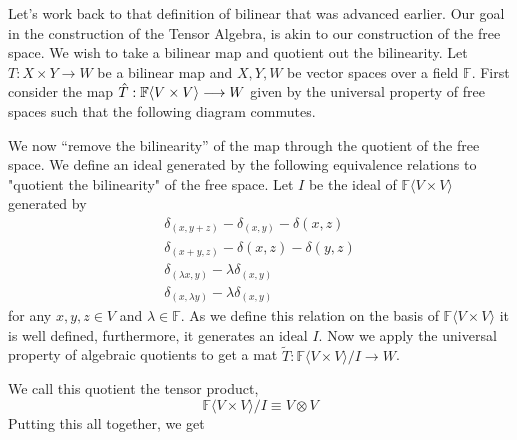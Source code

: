 \documentclass[12pt]{extarticle}
\newcommand{\freespace}[1] {{\F\langle #1 \rangle}}
\renewcommand{\to}[0]{\longrightarrow}
\newcommand{\F}{{\mathbb{F}}}
\begin{document}
Let's work back to that definition of bilinear that was advanced earlier. Our goal in the construction of the Tensor Algebra, is akin to our construction of the free space. We wish to take a bilinear map and quotient out the bilinearity. Let $T : X \times Y \to W$ be a bilinear map and $X, Y, W$ be vector spaces over a field $\F$. First consider the map $\Hat{T} : \freespace{V \times V} \to W$ given by the universal property of free spaces such that the following diagram commutes. 

\begin{center}
  \end{center}

We now ``remove the bilinearity'' of the map through the quotient of the free space. We define an ideal generated by the following equivalence relations to "quotient the bilinearity" of the free space. Let $I$ be the ideal of $\freespace{V \times V}$ generated by 
\begin{gather*}
  \delta_{(x,y +z)} - \delta_{(x,y)} - \delta{(x, z)} \\
  \delta_{(x + y, z)} - \delta{(x, z)} - \delta{(y,z)} \\
  \delta_{(\lambda x, y)} - \lambda \delta_{(x,y)} \\
  \delta_{(x, \lambda y)} - \lambda \delta_{(x,y)}
\end{gather*}
for any $x, y, z \in V$ and $\lambda \in \F$. As we define this relation on the basis of $\freespace{V \times V}$ it is well defined, furthermore, it generates an ideal $I$. Now we apply the universal property of algebraic quotients to get a mat $\tilde{T} : \freespace{V \times V} / I \to W$.
\begin{center}
  \end{center}
We call this quotient the tensor product, 
\[
  \freespace{V \times V} / I \equiv V \otimes V
\]
Putting this all together, we get 
\end{document}
